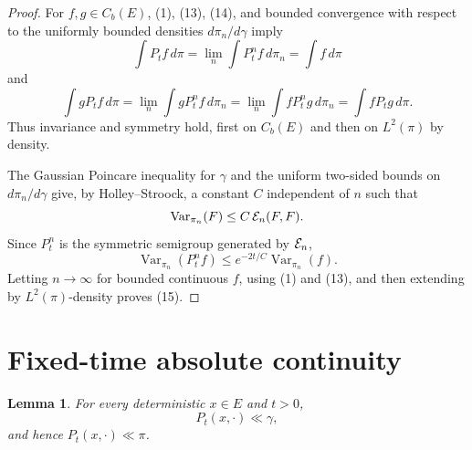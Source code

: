 \documentclass[12pt]{article}
\newtheorem{lemma}{Lemma}
\newcommand{\1}{\mathbf 1}
\newcommand{\Var}{\operatorname{Var}}
\begin{document}
\begin{proof}
For \(f,g\in C_b(E)\), (1), (13), (14), and bounded convergence with respect
to the uniformly bounded densities \(d\pi_n/d\gamma\) imply
\[
 \int P_tf\,d\pi=\lim_n\int P_t^nf\,d\pi_n=\int f\,d\pi
\]
and
\[
 \int gP_tf\,d\pi=\lim_n\int gP_t^nf\,d\pi_n
       =\lim_n\int fP_t^ng\,d\pi_n=\int fP_tg\,d\pi .
\]
Thus invariance and symmetry hold, first on \(C_b(E)\) and then on
\(L^2(\pi)\) by density.

The Gaussian Poincare inequality for \(\gamma\) and the uniform two-sided
bounds on \(d\pi_n/d\gamma\) give, by Holley--Stroock, a constant \(C\)
independent of \(n\) such that
\[
      \Var_{\pi_n}(F)\le C\,{\cal E}_n(F,F).
\]
Since \(P_t^n\) is the symmetric semigroup generated by \({\cal E}_n\),
\[
      \Var_{\pi_n}(P_t^n f)\le e^{-2t/C}\Var_{\pi_n}(f).
\]
Letting \(n\to\infty\) for bounded continuous \(f\), using (1) and (13), and
then extending by \(L^2(\pi)\)-density proves (15).
\end{proof}

\section*{Fixed-time absolute continuity}

\begin{lemma}\label{lem:control}
For every deterministic \(x\in E\) and \(t>0\),
\[
        P_t(x,\cdot)\ll \gamma ,
\]
and hence \(P_t(x,\cdot)\ll\pi\).
\end{lemma}
\end{document}
